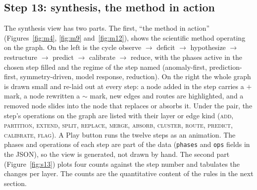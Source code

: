 \documentclass[11pt,a4paper]{article}
\begin{document}
\subsection*{Step 13: synthesis, the method in action}
The synthesis view has two parts. The first, ``the method in action'' (Figures~\ref{fig:m4}, \ref{fig:m9} and~\ref{fig:m12}), shows the scientific method operating on the graph. On the left is the cycle observe $\to$ deficit $\to$ hypothesize $\to$ restructure $\to$ predict $\to$ calibrate $\to$ reduce, with the phases active in the chosen step filled and the regime of the step named (anomaly-first, prediction-first, symmetry-driven, model response, reduction). On the right the whole graph is drawn small and re-laid out at every step: a node added in the step carries a $+$ mark, a node rewritten a $\sim$ mark, new edges and routes are highlighted, and a removed node slides into the node that replaces or absorbs it. Under the pair, the step's operations on the graph are listed with their layer or edge kind (\textsc{add}, \textsc{partition}, \textsc{extend}, \textsc{split}, \textsc{replace}, \textsc{merge}, \textsc{absorb}, \textsc{cluster}, \textsc{route}, \textsc{predict}, \textsc{calibrate}, \textsc{flag}). A Play button runs the twelve steps as an animation. The phases and operations of each step are part of the data (\texttt{phases} and \texttt{ops} fields in the JSON), so the view is generated, not drawn by hand. The second part (Figure~\ref{fig:s13}) plots four counts against the step number and tabulates the changes per layer. The counts are the quantitative content of the rules in the next section.
\end{document}
